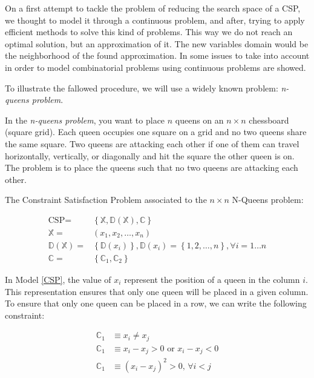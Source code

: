 On a first attempt to tackle the problem of reducing the search space of a CSP, we thought to model it through a continuous problem, and after, trying to apply efficient methods to solve this kind of problems. This way we do not reach an optimal solution, but an approximation of it. The new variables domain would be the neighborhood of the found approximation. In \cite{Pardalos2006} some issues to take into account in order to model combinatorial problems using continuous problems are showed.

To illustrate the fallowed procedure, we will use a widely known problem: \textit{n-queens problem}.

In the \textit{n-queens problem}, you want to place $n$ queens on an $n \times n$ chessboard (square grid). Each queen occupies one square on a grid and no two queens share the same square. Two queens are attacking each other if one of them can  travel horizontally, vertically, or diagonally and hit the square the other queen is on. The problem is to place the queens such that no two queens are attacking each other.

The Constraint Satisfaction Problem associated to the $n\times n$ N-Queens problem:

\begin{equation}
\begin{array}{rl}
\label{CSP}\text{CSP} = &\left\{\mathbb{X}, \mathbb{D(X)}, \mathbb{C}\right\}\\
\mathbb{X} =& \left(x_1, x_2, \dots, x_n\right)\\
\mathbb{D(X)} =& \left\{\mathbb{D}(x_i)\right\}, \mathbb{D}(x_i) = \left\{1, 2, \dots, n\right\}, \forall i = 1 \dots n\\
\mathbb{C} =& \left\{\mathbb{C}_1, \mathbb{C}_2\right\}
\end{array}
\end{equation}

In Model \ref{CSP}, the value of $x_i$ represent the position of a queen in the column $i$. This representation ensures that only one queen will be placed in a given column. To ensure that only one queen can be placed in a row, we can write the following constraint:

\begin{align*}
\mathbb{C}_1 &\equiv x_i \neq x_j\\
\mathbb{C}_1 &\equiv x_i - x_j > 0 \text{  or  } x_i - x_j < 0\\
\mathbb{C}_1 &\equiv \left(x_i - x_j\right)^2 > 0\text{, }\forall i < j\\
\end{align*}

